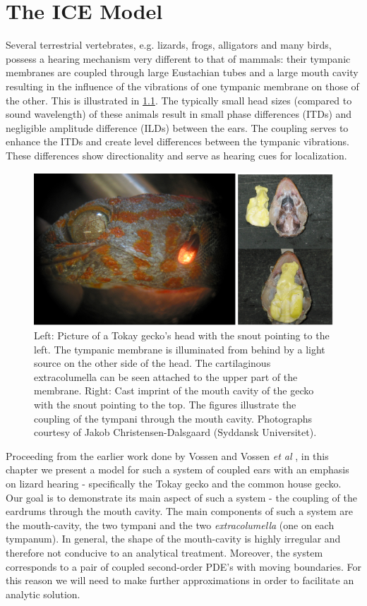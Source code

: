 \chapter{The ICE Model}\label{modelchapter}
Several terrestrial vertebrates, e.g. lizards, frogs, alligators and many birds, possess a hearing mechanism very different to
that of mammals: their tympanic membranes are coupled through large Eustachian tubes and a large mouth cavity resulting in the influence of the vibrations of one tympanic membrane
on those of the other. This is illustrated in \ref{geckohead}. The typically small head sizes (compared to sound wavelength) of these animals result in
small phase differences (ITDs) and negligible amplitude difference (ILDs) between the ears. The coupling serves to enhance the ITDs and create level differences
between the tympanic vibrations. These differences show directionality and serve as hearing cues for localization.

\begin{figure}[ht!]
 \centering
 \includegraphics[width=.85\linewidth]{Diagrams/geckohead1.png}
 \caption[Illustration of a gecko's head]{Left: Picture of a Tokay gecko's head with the snout pointing to the left. The tympanic membrane is illuminated from behind by
 a light source on the other side of the head. The cartilaginous extracolumella can be seen attached to the upper part of the membrane.
 Right: Cast imprint of the mouth cavity of the gecko with the snout pointing to the top. The figures illustrate the coupling of the tympani through the mouth cavity.
 Photographs courtesy of Jakob Christensen-Dalsgaard (Syddansk Universitet).}
  \label{geckohead}
\end{figure}

Proceeding from the earlier work done by Vossen \cite{vossenthesis} and Vossen \emph{et al} \cite{vossenjasa}, in this chapter we present a model for such a system of coupled ears with an emphasis on lizard hearing
- specifically the Tokay gecko and the common house gecko. Our goal is to demonstrate its main aspect of such a system - the coupling
of the eardrums through the mouth cavity. 
The main components of such a system are the mouth-cavity, the two tympani and the two \textit{extracolumella} (one on each tympanum). In general, the shape of the mouth-cavity is highly irregular and therefore
not conducive to an analytical treatment. Moreover, the system corresponds to a pair of coupled second-order PDE's with
moving boundaries. For this reason we will need to make further approximations in order to facilitate an
analytic solution.

